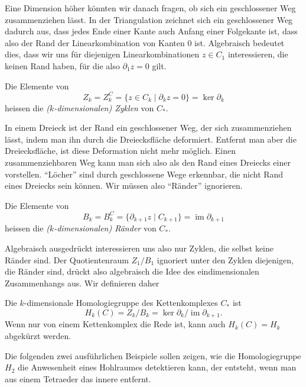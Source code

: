 Eine Dimension höher könnten wir danach fragen, ob sich ein geschlossener
Weg zusammenziehen lässt.
In der Triangulation zeichnet sich ein geschlossener Weg dadurch aus,
dass jedes Ende einer Kante auch Anfang einer Folgekante ist, dass also
der Rand der Linearkombination von Kanten 0 ist.
Algebraisch bedeutet dies, dass wir uns für diejenigen Linearkombinationen
$z\in C_1$ interessieren, die keinen Rand haben, für die also $\partial_1z=0$
gilt.

\begin{definition}
Die Elemente von
\[
Z_k
=
Z_k^C
=
\{z\in C_k\;|\; \partial_k z = 0\}
=
\ker \partial_k
\]
heissen die {\em ($k$-dimensionalen) Zyklen} von $C_*$.
\end{definition}

In einem Dreieck ist der Rand ein geschlossener Weg, der sich zusammenziehen
lässt, indem man ihn durch die Dreiecksfläche deformiert.
Entfernt man aber die Dreiecksfläche, ist diese Deformation nicht mehr
möglich.
Einen zusammenziehbaren Weg kann man sich also als den Rand eines Dreiecks
einer vorstellen.
``Löcher'' sind durch geschlossene Wege erkennbar, die nicht Rand eines
Dreiecks sein können.
Wir müssen also ``Ränder'' ignorieren.

\begin{definition}
Die Elemente von
\[
B_k
=
B_k^C
=
\{\partial_{k+1}z\;|\; C_{k+1}\}
=
\operatorname{im} \partial_{k+1}
\]
heissen die {\em ($k$-dimensionalen) Ränder} von $C_*$.
\end{definition}

Algebraisch ausgedrückt interessieren uns also nur Zyklen, die selbst
keine Ränder sind.
Der Quotientenraum $Z_1/B_1$ ignoriert unter den Zyklen diejenigen, die
Ränder sind, drückt also algebraisch die Idee des eindimensionalen
Zusammenhangs aus.
Wir definieren daher

\begin{definition}
Die $k$-dimensionale Homologiegruppe des Kettenkomplexes $C_*$ ist
\[
H_k(C) = Z_k/B_k = \ker \partial_k / \operatorname{im} \partial_{k+1}.
\]
Wenn nur von einem Kettenkomplex die Rede ist, kann auch $H_k(C)=H_k$
abgekürzt werden.
\end{definition}

Die folgenden zwei ausführlichen Beispiele sollen zeigen, wie die
Homologiegruppe $H_2$ die Anwesenheit eines Hohlraumes detektieren kann,
der entsteht, wenn man aus einem Tetraeder das innere entfernt.

